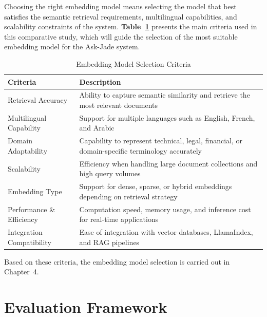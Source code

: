 Choosing the right embedding model means selecting the model that best
satisfies the semantic retrieval requirements, multilingual capabilities,
and scalability constraints of the system. \textbf{Table~\ref{tab:embedding_criteria}}
presents the main criteria used in this comparative study, which will 
guide the selection of the most suitable embedding model for the 
Ask-Jade system.

\begin{table}[H]
\centering
\caption{Embedding Model Selection Criteria}
\label{tab:embedding_criteria}
\begin{tabular}{|p{5cm}|p{9cm}|}
\hline
\textbf{Criteria} & \textbf{Description} \\
\hline

Retrieval Accuracy &
Ability to capture semantic similarity and retrieve the most relevant
documents \\
\hline

Multilingual Capability &
Support for multiple languages such as English, French, and Arabic \\
\hline

Domain Adaptability &
Capability to represent technical, legal, financial, or domain-specific
terminology accurately \\
\hline

Scalability &
Efficiency when handling large document collections and high query volumes \\
\hline

Embedding Type &
Support for dense, sparse, or hybrid embeddings depending on retrieval
strategy \\
\hline

Performance \& Efficiency &
Computation speed, memory usage, and inference cost for real-time
applications \\
\hline

Integration Compatibility &
Ease of integration with vector databases, LlamaIndex, and RAG pipelines \\
\hline

\end{tabular}
\end{table}

Based on these criteria, the embedding model selection 
is carried out in Chapter~4.




\section{Evaluation Framework}
\label{sec:eval_framework}

